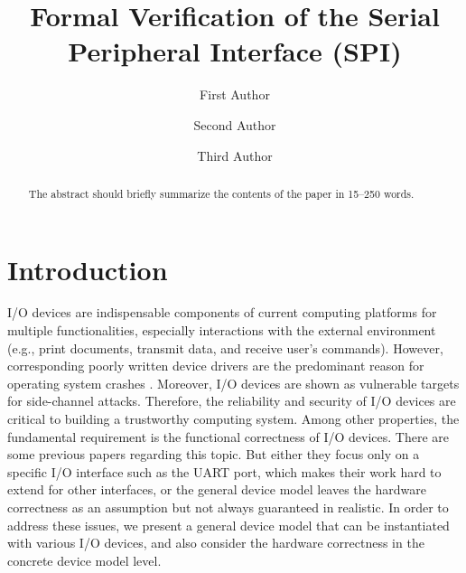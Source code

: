 \documentclass[runningheads]{llncs}
\begin{document}
%
\title{Formal Verification of the Serial Peripheral Interface (SPI)}
%
%
\author{First Author \and
Second Author \and
Third Author}
%
%

%
\maketitle              %
%
\begin{abstract}
The abstract should briefly summarize the contents of the paper in
15--250 words.

\end{abstract}
%
%
%
\section{Introduction}
I/O devices are indispensable components of current computing platforms for multiple functionalities, especially interactions with the external environment (e.g., print documents, transmit data, and receive user's commands). However, corresponding poorly written device drivers are the predominant reason for operating system crashes \cite{chou2001empirical,ganapathi2006windows,orgovan2003introduction}. Moreover, I/O devices are shown as vulnerable targets for side-channel attacks\cite{}. Therefore, the reliability and security of I/O devices are critical to building a trustworthy computing system. Among other properties, the fundamental requirement is the functional correctness of I/O devices. There are some previous papers regarding this topic. But either they focus only on a specific I/O interface such as the UART port\cite{alkassar2007,duan2010correctness}, which makes their work hard to extend for other interfaces, or the general device model leaves the hardware correctness as an assumption\cite{chen2016toward} but not always guaranteed in realistic. In order to address these issues, we present a general device model that can be instantiated with various I/O devices, and also consider the hardware correctness in the concrete device model level.
 
\end{document}
